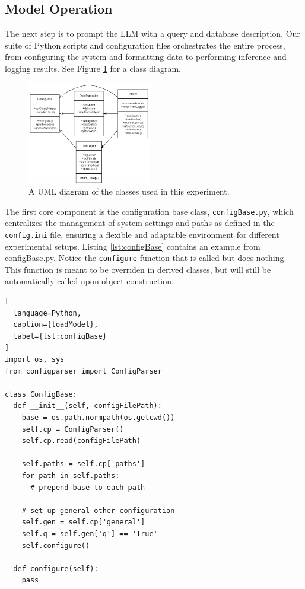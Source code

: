 \subsection{Model Operation}
The next step is to prompt the LLM with a query and database description. Our suite of Python scripts and configuration files orchestrates the entire process, from configuring the system and formatting data to performing inference and logging results. See Figure \ref{fig:classDiagram} for a class diagram.
\begin{figure}[htb]
  \centering
  \includegraphics[width=0.48\textwidth]{figures/classDiagram.png}
  \caption{A UML diagram of the classes used in this experiment.}
  \label{fig:classDiagram}
\end{figure}

The first core component is the configuration base class, \lstinline{configBase.py}, which centralizes the management of system settings and paths as defined in the \lstinline{config.ini} file, ensuring a flexible and adaptable environment for different experimental setups. Listing \ref{lst:configBase} contains an example from \href{https://github.com/MatousAc/llamaExecPlan/blob/main/src/configBase.py}{configBase.py}. Notice the \lstinline{configure} function that is called but does nothing. This function is meant to be overriden in derived classes, but will still be automatically called upon object construction.

\begin{lstlisting}[
  language=Python,
  caption={loadModel},
  label={lst:configBase}
]
import os, sys
from configparser import ConfigParser

class ConfigBase:
  def __init__(self, configFilePath):
    base = os.path.normpath(os.getcwd())
    self.cp = ConfigParser()
    self.cp.read(configFilePath)

    self.paths = self.cp['paths']
    for path in self.paths:
      # prepend base to each path
    
    # set up general other configuration
    self.gen = self.cp['general']
    self.q = self.gen['q'] == 'True'
    self.configure()
  
  def configure(self):
    pass
\end{lstlisting}

